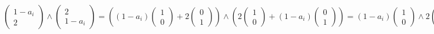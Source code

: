 \documentclass[oneside,english]{amsbook}
\numberwithin{section}{chapter}
\theoremstyle{plain}
\theoremstyle{definition}
\begin{document}
\[{\begin{pmatrix}
		1 - a_{i} \\
		2
	\end{pmatrix} \land \begin{pmatrix}
		2 \\
		1 - a_{i}
	\end{pmatrix} = \left( \left( 1 - a_{i} \right)\begin{pmatrix}
		1 \\
		0
	\end{pmatrix} + 2\begin{pmatrix}
		0 \\
		1
	\end{pmatrix} \right) \land \left( 2\begin{pmatrix}
		1 \\
		0
	\end{pmatrix} + \left( 1 - a_{i} \right)\begin{pmatrix}
		0 \\
		1
	\end{pmatrix} \right)
}{= \left( 1 - a_{i} \right)\begin{pmatrix}
		1 \\
		0
	\end{pmatrix} \land 2\begin{pmatrix}
		1 \\
		0
	\end{pmatrix} + \left( 1 - a_{i} \right)\begin{pmatrix}
		1 \\
		0
	\end{pmatrix} \land \left( 1 - a_{i} \right)\begin{pmatrix}
		0 \\
		1
	\end{pmatrix} + 2\begin{pmatrix}
		0 \\
		1
	\end{pmatrix} \land 2\begin{pmatrix}
		1 \\
		0
	\end{pmatrix} + 2\begin{pmatrix}
		0 \\
		1
	\end{pmatrix} \land \left( 1 - a_{i} \right)\begin{pmatrix}
		0 \\
		1
	\end{pmatrix}
}{= \left( 1 - a_{i} \right)\begin{pmatrix}

\end{pmatrix}}\]
\end{document}

